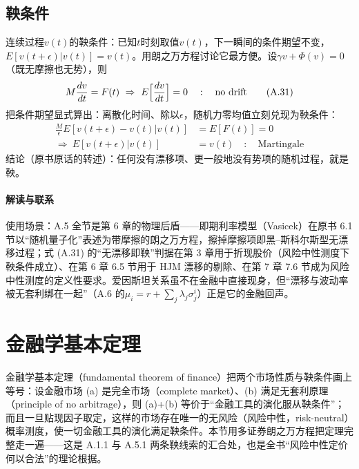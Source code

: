 \subsection{鞅条件}

连续过程$v(t)$的鞅条件：已知$t$时刻取值$v(t)$，下一瞬间的条件期望不变，$E[v(t+\epsilon)|v(t)]=v(t)$。用朗之万方程讨论它最方便。设$\gamma v+\Phi(v)=0$（既无摩擦也无势），则
\begin{equation*}
M\frac{dv}{dt}=F(t)
\ \Rightarrow\
E\Bigl[\frac{dv}{dt}\Bigr]=0
\quad:\quad\text{no drift}
\tag{A.31}
\end{equation*}
把条件期望显式算出：离散化时间、除以$\epsilon$，随机力零均值立刻兑现为鞅条件：
\begin{align*}
\frac{M}{\epsilon}E[v(t+\epsilon)-v(t)|v(t)]&=E[F(t)]=0\\
\Rightarrow\ E[v(t+\epsilon)|v(t)]&=v(t)
\quad:\quad\text{Martingale}
\end{align*}
结论（原书原话的转述）：任何没有漂移项、更一般地没有势项的随机过程，就是鞅。

\paragraph{解读与联系}
使用场景：A.5 全节是第 6 章的物理后盾——即期利率模型（Vasicek）在原书 6.1 节以“随机量子化”表述为带摩擦的朗之万方程，擦掉摩擦项即黑--斯科尔斯型无漂移过程；式 (A.31) 的“无漂移即鞅”判据在第 3 章用于折现股价（风险中性测度下鞅条件成立）、在第 6 章 6.5 节用于 HJM 漂移的剔除、在第 7 章 7.6 节成为风险中性测度的定义性要求。爱因斯坦关系虽不在金融中直接现身，但“漂移与波动率被无套利绑在一起”（A.6 的$\mu_i=r+\sum_j\lambda_j\sigma_j^i$）正是它的金融回声。

\section{金融学基本定理}

金融学基本定理（fundamental theorem of finance）把两个市场性质与鞅条件画上等号：设金融市场 (a) 是完全市场（complete market）、(b) 满足无套利原理（principle of no arbitrage），则 (a)+(b) 等价于“金融工具的演化服从鞅条件”；而且一旦贴现因子取定，这样的市场存在唯一的无风险（风险中性，risk-neutral）概率测度，使一切金融工具的演化满足鞅条件。本节用多证券朗之万方程把定理完整走一遍——这是 A.1.1 与 A.5.1 两条鞅线索的汇合处，也是全书“风险中性定价何以合法”的理论根据。

